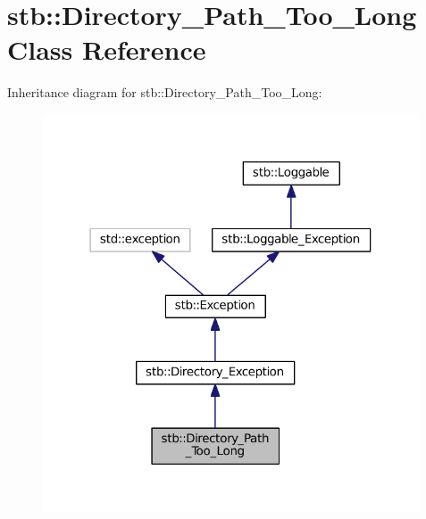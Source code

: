 \hypertarget{classstb_1_1Directory__Path__Too__Long}{\section{stb\+:\+:Directory\+\_\+\+Path\+\_\+\+Too\+\_\+\+Long Class Reference}
\label{classstb_1_1Directory__Path__Too__Long}
}


Inheritance diagram for stb\+:\+:Directory\+\_\+\+Path\+\_\+\+Too\+\_\+\+Long\+:
\nopagebreak
\begin{figure}[H]
\begin{center}
\leavevmode
\includegraphics[width=316pt]{classstb_1_1Directory__Path__Too__Long__inherit__graph}
\end{center}
\end{figure}


